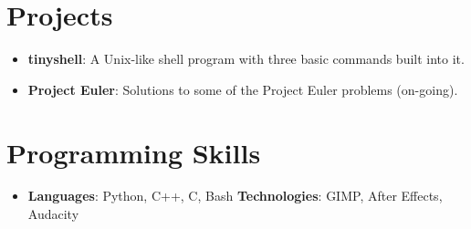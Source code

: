 \documentclass[letterpaper,11pt]{article}
\newcommand{\resumeItem}[2]{
  \item\small{
    \textbf{#1}{: #2 \vspace{-2pt}}
  }
}
\newcommand{\resumeSubItem}[2]{\resumeItem{#1}{#2}\vspace{-4pt}}
\newcommand{\resumeSubHeadingListStart}{\begin{itemize}[leftmargin=*]}
\newcommand{\resumeSubHeadingListEnd}{\end{itemize}}
\begin{document}
\section{Projects}
  \resumeSubHeadingListStart
    \resumeSubItem{tinyshell}
      {A Unix-like shell program with three basic commands built into it.}
    \resumeSubItem{Project Euler}
      {Solutions to some of the Project Euler problems (on-going).}
  \resumeSubHeadingListEnd

%
\section{Programming Skills}
  \resumeSubHeadingListStart
    \item{
      \textbf{Languages}{: Python, C++, C, Bash}
      \hfill
      \textbf{Technologies}{: GIMP, After Effects, Audacity}
    }
  \resumeSubHeadingListEnd


\end{document}
